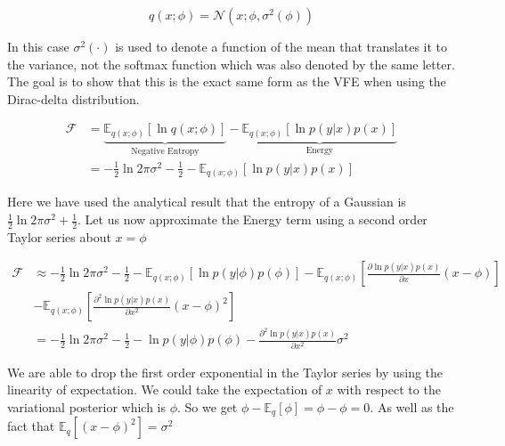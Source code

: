 \documentclass{article}
\begin{document}
\begin{equation}
	q(x; \phi) = \mathcal{N}(x; \phi, \sigma^2(\phi))
\end{equation}

In this case $\sigma^2(\cdot)$ is used to denote a function of the mean that translates it to the variance, not the softmax function which was also denoted by the same letter. The goal is to show that this is the exact same form as the VFE when using the Dirac-delta distribution.


\begin{equation*}
	\begin{aligned}
		\mathcal{F} &= \underbrace{\mathbb{E}_{q(x ; \phi)} \left[ 	\ln q(x ; \phi) \right]}_{\text{Negative Entropy}} - \underbrace{\mathbb{E}_{q(x ; \phi)} \left[ 	\ln p(y | x) p(x) \right]}_{\text{Energy}} \\
		&= - \frac{1}{2} \ln 2\pi \sigma^2 - \frac{1}{2} -  \mathbb{E}_{q(x ; \phi)} \left[ 	\ln p(y | x) p(x) \right]
	\end{aligned}
\end{equation*}

Here we have used the analytical result that the entropy of a Gaussian is $\frac{1}{2} \ln 2\pi \sigma^2 + \frac{1}{2}$. Let us now approximate the Energy term using a second order Taylor series about $x = \phi$

\begin{equation}
	\begin{aligned}
		\mathcal{F} &\approx  - \frac{1}{2} \ln 2\pi \sigma^2 - \frac{1}{2} -  \mathbb{E}_{q(x ; \phi)} \left[ 	\ln p(y | \phi) p(\phi) \right] -  \mathbb{E}_{q(x ; \phi)} \left[ 	\frac{ \partial \ln p(y | x) p(x)}{\partial x}(x - \phi) \right] \\
		& -  \mathbb{E}_{q(x ; \phi)} \left[ \frac{\partial^2 \ln p(y | x) p(x)}{\partial x^2}(x - \phi)^2 \right] \\
		&=  - \frac{1}{2} \ln 2\pi \sigma^2 - \frac{1}{2} - \ln p(y | \phi) p(\phi) - \frac{\partial^2 \ln p(y | x) p(x)}{\partial x^2}\sigma^2
	\end{aligned}
\end{equation}

We are able to drop the first order exponential in the Taylor series by using the linearity of expectation. We could take the expectation of $x$ with respect to the variational posterior which is $\phi$. So we get $\phi - \mathbb{E}_q[\phi] = \phi - \phi = 0$. As well as the fact that $\mathbb{E}_q[( x - \phi )^2] = \sigma^2$
\end{document}
